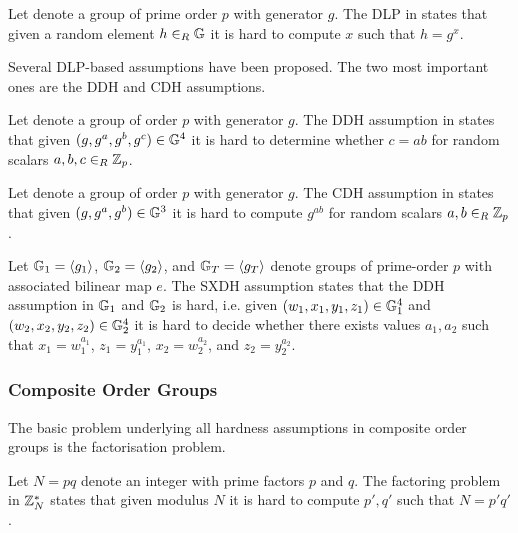 \begin{definition}\label{def:dlp}
Let \GG denote a group of prime order $p$ with generator $g$.
The \ac{DLP} in \GG states that given a random element $h\rin\GG$ it is hard to compute $x$ such that $h=g^x$.
\eod
\end{definition}

\noindent
Several \ac{DLP}-based assumptions have been proposed.
The two most important ones are the \ac{DDH} and \ac{CDH} assumptions.

\begin{definition}\label{def:ddh}
Let \GG denote a group of order $p$ with generator $g$.
The \ac{DDH} assumption in \GG states that given $(g,g^a,g^b,g^c)\in\GG^4$ it is hard to determine whether $c=ab$ for random scalars $a,b,c\rin\ZZ_p$.
\eod
\end{definition}

\begin{definition}\label{def:cdh}
Let \GG denote a group of order $p$ with generator $g$.
The \ac{CDH} assumption in \GG states that given $(g,g^a,g^b)\in\GG^3$ it is hard to compute $g^{ab}$ for random scalars $a,b\rin\ZZ_p$.
\eod
\end{definition}

\begin{definition}\label{def:sxdh}
Let $\GG_1=\genG[1]$, $\GG_2=\genG[2]$, and $\GG_T=\genG[T]$ denote groups of prime-order $p$ with associated bilinear map $e$.
The \ac{SXDH} assumption states that the DDH assumption in $\GG_1$ and $\GG_2$ is hard, i.e. given $(w_1,x_1,y_1,z_1)\in\GG^4_1$ and $(w_2,x_2,y_2,z_2)\in\GG^4_2$ it is hard to decide whether there exists values $a_1,a_2$ such that $x_1=w_1^{a_1}$, $z_1=y_1^{a_1}$, $x_2=w_2^{a_2}$, and $z_2=y_2^{a_2}$.
\eod
\end{definition}

\subsubsection{Composite Order Groups}
The basic problem underlying all hardness assumptions in composite order groups is the factorisation problem.

\begin{definition}\label{def:factoring}
Let $N=pq$ denote an integer with prime factors $p$ and $q$.
The factoring problem in $\ZZ^\ast_N$ states that given modulus $N$ it is hard to compute $p',q'$ such that $N=p'q'$.
\eod
\end{definition}

